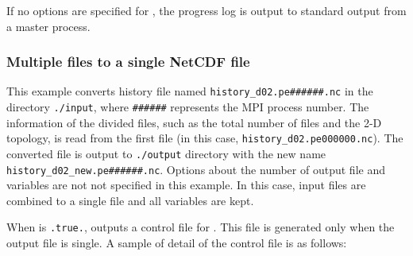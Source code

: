 If no options are specified for , the progress log is output to standard output from a master process.

\subsubsection{Multiple \scalenetcdf files to a single NetCDF file}


This example converts history file named \verb|history_d02.pe######.nc| in the directory \verb|./input|, where \verb|######| represents the MPI process number.
The information of the divided files, such as the total number of files and the 2-D topology, is read from the first file (in this case, \verb|history_d02.pe000000.nc|). The converted file is output to \verb|./output| directory with the new name \verb|history_d02_new.pe######.nc|.
Options about the number of output file and variables are not not specified in this example. In this case, input files are combined to a single file and all variables are kept.

When  is \verb|.true.|, \sno outputs a control file for \grads. This file is generated only when the output file is single. A sample of detail of the control file is as follows:

